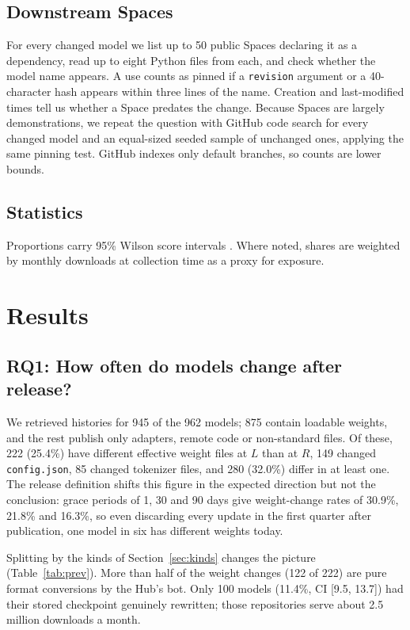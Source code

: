 \documentclass[conference]{IEEEtran}
\newcommand{\code}[1]{\texttt{#1}}
\begin{document}
\subsection{Downstream Spaces}
For every changed model we list up to 50 public Spaces declaring it as a dependency, read up to eight Python files from each, and check whether the model name appears. A use counts as pinned if a \code{revision} argument or a 40-character hash appears within three lines of the name. Creation and last-modified times tell us whether a Space predates the change. Because Spaces are largely demonstrations, we repeat the question with GitHub code search for every changed model and an equal-sized seeded sample of unchanged ones, applying the same pinning test. GitHub indexes only default branches, so counts are lower bounds.

\subsection{Statistics}
Proportions carry 95\% Wilson score intervals \cite{wilson1927}. Where noted, shares are weighted by monthly downloads at collection time as a proxy for exposure.

\section{Results}

\subsection{RQ1: How often do models change after release?}
We retrieved histories for 945 of the 962 models; 875 contain loadable weights, and the rest publish only adapters, remote code or non-standard files. Of these, 222 (25.4\%) have different effective weight files at $L$ than at $R$, 149 changed \code{config.json}, 85 changed tokenizer files, and 280 (32.0\%) differ in at least one. The release definition shifts this figure in the expected direction but not the conclusion: grace periods of 1, 30 and 90 days give weight-change rates of 30.9\%, 21.8\% and 16.3\%, so even discarding every update in the first quarter after publication, one model in six has different weights today.\label{sec:grace}

Splitting by the kinds of Section~\ref{sec:kinds} changes the picture (Table~\ref{tab:prev}). More than half of the weight changes (122 of 222) are pure format conversions by the Hub's bot. Only 100 models (11.4\%, CI [9.5, 13.7]) had their stored checkpoint genuinely rewritten; those repositories serve about 2.5 million downloads a month.
\end{document}
